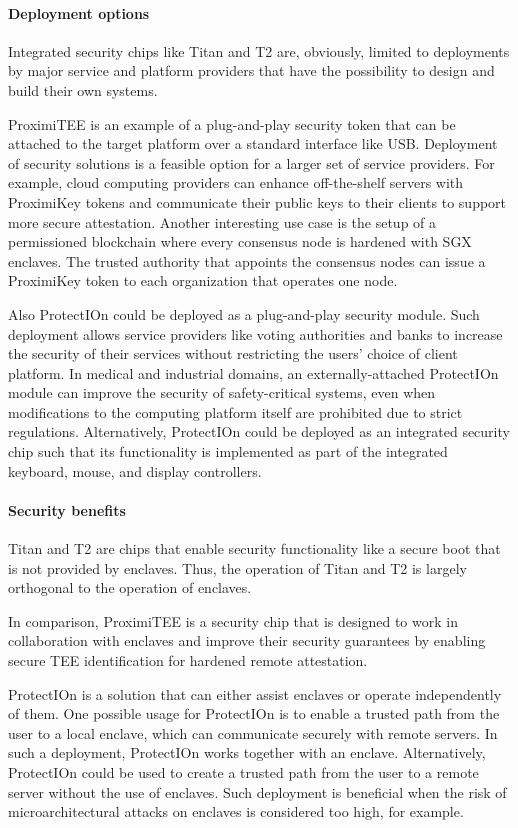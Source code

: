 \documentclass[letterpaper,twocolumn,10pt]{article}
\newcommand{\protection}{\textsf{ProtectIOn}\xspace}
\newcommand{\proximitee}{\textsf{ProximiTEE}\xspace}
\newcommand{\key}{\textsf{ProximiKey}\xspace}
\begin{document}
\paragraph{Deployment options}
Integrated security chips like Titan and T2 are, obviously, limited to deployments by major service and platform providers that have the possibility to design and build their own systems. 

\proximitee is an example of a plug-and-play security token that can be attached to the target platform over a standard interface like USB. Deployment of security solutions is a feasible option for a larger set of service providers. For example, cloud computing providers can enhance off-the-shelf servers with \key tokens and communicate their public keys to their clients to support more secure attestation. Another interesting use case is the setup of a permissioned blockchain where every consensus node is hardened with SGX enclaves. The trusted authority that appoints the consensus nodes can issue a \key token to each organization that operates one node.

Also \protection could be deployed as a plug-and-play security module. Such deployment allows service providers like voting authorities and banks to increase the security of their services without restricting the users' choice of client platform. In medical and industrial domains, an externally-attached \protection module can improve the security of safety-critical systems, even when modifications to the computing platform itself are prohibited due to strict regulations. Alternatively, \protection could be deployed as an integrated security chip such that its functionality is implemented as part of the integrated keyboard, mouse, and display controllers. 


\paragraph{Security benefits}
Titan and T2 are chips that enable security functionality like a secure boot that is not provided by enclaves. Thus, the operation of Titan and T2 is largely orthogonal to the operation of enclaves. 

In comparison, \proximitee is a security chip that is designed to work in collaboration with enclaves and improve their security guarantees by enabling secure TEE identification for hardened remote attestation. 

\protection is a solution that can either assist enclaves or operate independently of them. One possible usage for \protection is to enable a trusted path from the user to a local enclave, which can communicate securely with remote servers. In such a deployment, \protection works together with an enclave. Alternatively, \protection could be used to create a trusted path from the user to a remote server without the use of enclaves. Such deployment is beneficial when the risk of microarchitectural attacks on enclaves is considered too high, for example.
\end{document}
